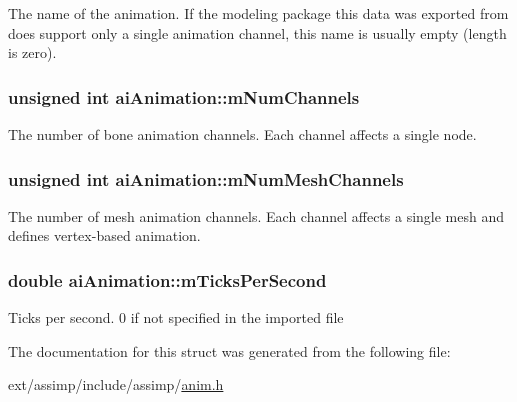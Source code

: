 The name of the animation. If the modeling package this data was exported from does support only a single animation channel, this name is usually empty (length is zero). \hypertarget{structai_animation_aebfccf9a9aefa6084566d21e8a30b7e5}{
\subsubsection[{m\-Num\-Channels}]{\setlength{\rightskip}{0pt plus 5cm}unsigned int ai\-Animation\-::m\-Num\-Channels}}\label{structai_animation_aebfccf9a9aefa6084566d21e8a30b7e5}
The number of bone animation channels. Each channel affects a single node. \hypertarget{structai_animation_ac43aacd8502020174e553501f0b6bf5f}{
\subsubsection[{m\-Num\-Mesh\-Channels}]{\setlength{\rightskip}{0pt plus 5cm}unsigned int ai\-Animation\-::m\-Num\-Mesh\-Channels}}\label{structai_animation_ac43aacd8502020174e553501f0b6bf5f}
The number of mesh animation channels. Each channel affects a single mesh and defines vertex-\/based animation. \hypertarget{structai_animation_afd26a40c3f16b6aa6e150effa3eaeab1}{
\subsubsection[{m\-Ticks\-Per\-Second}]{\setlength{\rightskip}{0pt plus 5cm}double ai\-Animation\-::m\-Ticks\-Per\-Second}}\label{structai_animation_afd26a40c3f16b6aa6e150effa3eaeab1}
Ticks per second. 0 if not specified in the imported file 

The documentation for this struct was generated from the following file\-:\begin{DoxyCompactItemize}
\item 
ext/assimp/include/assimp/\hyperlink{anim_8h}{anim.\-h}\end{DoxyCompactItemize}

